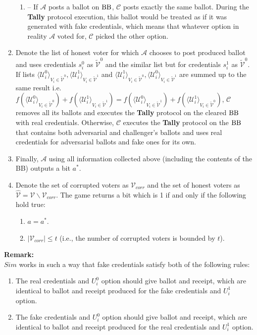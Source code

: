 \begin{enumerate}
\begin{enumerate}
\item[] --  If  $\mathcal{A}$ posts a ballot on $\operatorname{BB}$, $\mathcal{C}$ posts exactly the same ballot. During the \textbf{Tally} protocol execution, this ballot would be treated as if it was generated with fake credentials, which means that whatever option in reality $\mathcal{A}$ voted for, $\mathcal{C}$ picked the other option.  
\end{enumerate}
\item Denote the list of honest voter for which $\mathcal{A}$ chooses to post produced ballot and uses credentials $s_i^0$  as $ \tilde{\mathcal{V}}^0$ and the similar list but for credentials $s_i^1$ as $ \tilde{\mathcal{V}}^0$.  If  lists $\langle \mathcal{U}^0_i \rangle _{V_i \in \tilde{\mathcal{V}}^0}, \langle \mathcal{U}^1_i \rangle _{V_i \in \tilde{\mathcal{V}}^1}$ and $\langle \mathcal{U}^1_i \rangle _{V_i \in \tilde{\mathcal{V}}^0}, \langle \mathcal{U}^0_i \rangle _{V_i \in \tilde{\mathcal{V}}^1}$ are summed up to the same result i.e. $f(\langle \mathcal{U}^0_i \rangle _{V_i \in \tilde{\mathcal{V}}^0} ) + f(\langle \mathcal{U}^1_i \rangle _{V_i \in \tilde{\mathcal{V}}^1} ) =  f(\langle \mathcal{U}^0_i \rangle _{V_i \in \tilde{\mathcal{V}}^1} ) +  f(\langle \mathcal{U}^1_i \rangle _{V_i \in \tilde{\mathcal{V}}^0} )$, $\mathcal{C}$ removes all its ballots and executes the \textbf{Tally} protocol on the cleared $\operatorname{BB}$ with real credentials. Otherwise, $\mathcal{C}$ executes the \textbf{Tally} protocol on the $\operatorname{BB}$ that contains both adversarial and challenger's ballots and uses real credentials for adversarial ballots and fake ones for its own. 
\item Finally, $\mathcal{A}$ using all information collected above (including the contents of the BB) outputs a bit $a^*$.
\item Denote the set of corrupted voters as $\mathcal{V}_{corr}$ and the set of honest voters as $\hat{\mathcal{V}}= \mathcal{V} \backslash \mathcal{V}_{corr}$. The game returns a bit which is 1 if and only if the following hold true:
\begin{enumerate}
 \item $a = a^*$.
 \item $|\mathcal{V}_{corr}| \leq t$ (i.e., the number of corrupted voters is bounded by $t$).
\end{enumerate} 
\end{enumerate}

\textbf{Remark:}\\
$Sim$ works in such a way that fake credentials satisfy both of the following rules: 
\begin{enumerate}
 \item The real credentials and $U_i^0$ option  should give ballot and receipt, which are identical to ballot and receipt produced for the fake credentials and  $U_i^1$ option.
 \item The fake credentials and $U_i^0$ option  should give ballot and receipt, which are identical to ballot and receipt produced for the real credentials and  $U_i^1$ option.
 \end{enumerate}

